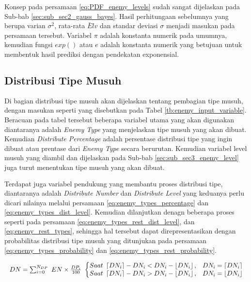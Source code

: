 Konsep pada persamaan \ref{eq:PDF_enemy_levels} sudah sangat dijelaskan pada Sub-bab \ref{sec:sub_sec2_gauss_bayes}. Hasil perhitungaan sebelumnya yang berupa varian $\sigma^2$, rata-rata $\bar{E}lv$ dan standar deviasi $\sigma$ menjadi masukan pada persamaan tersebut. Variabel $\pi$ adalah konstanta numerik pada umumnya, kemudian fungsi $exp()$ atau $e$ adalah konstanta numerik yang betujuan untuk membentuk hasil prediksi dengan pendekatan exponensial.
\vspace{1ex}

\subsection{Distribusi Tipe Musuh}
\label{sec:sub_sec3_enemy_type}
\vspace{1ex}

Di bagian distribusi tipe musuh akan dijelaskan tentang pembagian tipe musuh, dengan masukan seperti yang disebutkan pada Tabel \ref{tb:enemy_input_variable}. Beracuan pada tabel tersebut beberapa variabel utama yang akan digunakan diantaranya adalah \textit{Enemy Type} yang menjelaskan tipe musuh yang akan dibuat. Kemudian \textit{Distribute Percentage} adalah persentase distribusi tipe yang ingin dibuat atau prentase dari \textit{Enemy Type} secara berurutan. Kemudian variabel level musuh yang diambil dan dijelaskan pada Sub-bab \ref{sec:sub_sec3_enemy_level} juga turut menentukan tipe musuh yang akan dibuat.
\vspace{1ex}

Terdapat juga variabel pendukung yang membantu proses distribusi tipe, diantaranya adalah \textit{Distribute Number} dan \textit{Distribute Level} yang keduanya perlu dicari nilainya melalui  persamaan \ref{eq:enemy_types_percentage} dan \ref{eq:enemy_types_dist_level}. Kemudian dilanjutkan denagn beberapa proses seperti pada persamaan \ref{eq:enemy_types_rest_dist_level}, dan \ref{eq:enemy_rest_types}, sehingga hal tersebut dapat direpresentasikan dengan probabilitas distribusi tipe musuh yang ditunjukan pada persamaan \ref{eq:enemy_types_probability} dan \ref{eq:enemy_types_rest_probability}.
\vspace{1ex}

\begin{equation}\label{eq:enemy_types_percentage}
\begin{split}
	\resizebox{\columnwidth}{!}{%
		$DN = \sum_{i = 0}^{N_{DP}}\ EN \times \frac{DP_{i}}{100}\ 
		\left\{\begin{matrix} 
		Saat\ \left \lceil DN_{i} \right \rceil - DN_{i} < DN_{i} - \left \lfloor DN_{i} \right \rfloor, & DN_{i} = \left \lceil DN_{i} \right \rceil \\ 
		Saat\ \left \lceil DN_{i} \right \rceil - DN_{i} > DN_{i} - \left \lfloor DN_{i} \right \rfloor, & DN_{i} = \left \lfloor DN_{i} \right \rfloor
		\end{matrix}\right.$%
	}
\end{split}
\end{equation}

